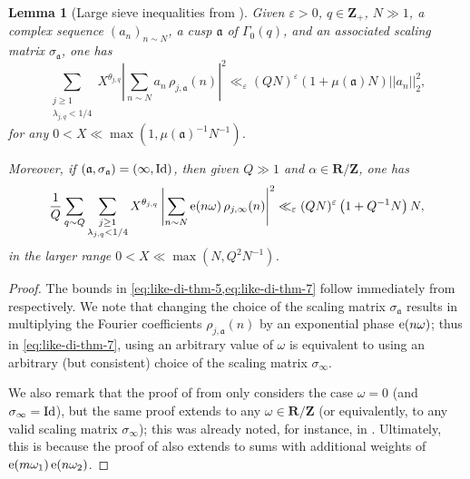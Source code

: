 \documentclass[reqno,11pt]{amsart}
\newtheorem{lemma}[theorem]{Lemma}
\theoremstyle{definition}
\theoremstyle{remark}
\numberwithin{equation}{section}
\newcommand{\Z}{\mathbf{Z}}
\newcommand{\R}{\mathbf{R}}
\newcommand{\ma}{\mathfrak{a}}
\newcommand{\e}{\textnormal{e}}
\newcommand{\Id}{\textnormal{Id}}
\newcommand{\eps}{\varepsilon}
\begin{document}
\begin{lemma}[Large sieve inequalities from \cite{deshouillers1982kloosterman}] \label{lem:di-large-sieve}
Given $\eps > 0$, $q \in \Z_+$, $N \gg 1$, a complex sequence $(a_n)_{n \sim N}$, a cusp $\ma$ of $\Gamma_0(q)$, and an associated scaling matrix $\sigma_{\ma}$, one has
\begin{equation} 
    \label{eq:like-di-thm-5}
    \sum_{\substack{j \ge 1 \\ \lambda_{j,q} < 1/4}}
    X^{\theta_{j,q}} 
    \left\vert 
    \sum_{n \sim N} a_n\, \rho_{j,\ma}(n)
    \right\vert^2 
    \ll_\eps 
    (QN)^\eps
    \left(1 + \mu(\ma) N\right) ||a_n||_2^2,
\end{equation}
for any $0 < X \ll \max(1, \mu(\ma)^{-1}N^{-1})$.

Moreover, if $(\ma, \sigma_{\ma}) = (\infty, \Id)$, then given $Q \gg 1$ and $\alpha \in \R/\Z$, one has
\begin{equation}
    \label{eq:like-di-thm-7}
    \frac{1}{Q} \sum_{q \sim Q} 
    \sum_{\substack{j \ge 1 \\ \lambda_{j,q} < 1/4}}
    X^{\theta_{j,q}}
    \left\vert \sum_{n \sim N} \e(n\omega)\, \rho_{j,\infty}(n) \right\vert^2
    \ll_\eps 
    (QN)^\eps \left(1 + Q^{-1}N\right) N,
\end{equation}
in the larger range $0 < X \ll \max\left(N, Q^2 N^{-1}\right)$.
\end{lemma}

\begin{proof}
The bounds in \cref{eq:like-di-thm-5,eq:like-di-thm-7} follow immediately from \cite[Theorems 5 and 7]{deshouillers1982kloosterman} respectively. We note that changing the choice of the scaling matrix $\sigma_{\ma}$ results in multiplying the Fourier coefficients $\rho_{j,\ma}(n)$ by an exponential phase $\e(n\omega)$; thus in \cref{eq:like-di-thm-7}, using an arbitrary value of $\omega$ is equivalent to using an arbitrary (but consistent) choice of the scaling matrix $\sigma_\infty$.

We also remark that the proof of \cite[Theorem 7]{deshouillers1982kloosterman} from \cite[\S 8.3]{deshouillers1982kloosterman} only considers the case $\omega = 0$ (and $\sigma_\infty = \Id$), but the same proof extends to any $\omega \in \R/\Z$ (or equivalently, to any valid scaling matrix $\sigma_\infty$); this was already noted, for instance, in \cite[Lemma 5]{bombieri1987primes2}. Ultimately, this is because the proof of \cite[Theorem 14]{deshouillers1982kloosterman} also extends to sums with additional weights of $\e(m\omega_1)\, \e(n\omega_2)$.
\end{proof}
\end{document}
